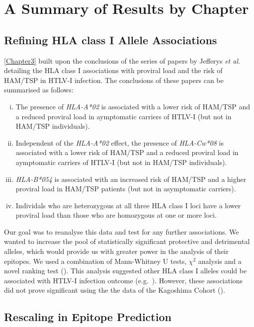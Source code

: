 \section{A Summary of Results by Chapter}

\subsection{Refining HLA class I Allele Associations}

\cref{Chapter3} built upon the conclusions of the series of papers by Jefferys \emph{et al.} \citep{Jeffery1999, Jeffery2000} detailing the HLA class I associations with proviral load and the risk of HAM/TSP in HTLV-I infection. The conclusions of these papers can be summarised as follows:

\begin{enumerate}[(i)]
\item The presence of \emph{HLA-A*02} is associated with a lower risk of HAM/TSP and a reduced proviral load in aymptomatic carriers of HTLV-I (but not in HAM/TSP individuals).
\item Independent of the \emph{HLA-A*02} effect, the presence of \emph{HLA-Cw*08} is associated with a lower risk of HAM/TSP and a reduced proviral load in aymptomatic carriers of HTLV-I (but not in HAM/TSP individuals).
\item \emph{HLA-B*054} is associated with an increased risk of HAM/TSP and a higher proviral load in HAM/TSP patients (but not in asymptomatic carriers).
\item Individals who are heterozygous at all three HLA class I loci have a lower proviral load than those who are homozygous at one or more loci.
\end{enumerate}

Our goal was to reanalyse this data and test for any further associations. We wanted to increase the pool of statistically significant protective and detrimental alleles, which would provide us with greater power in the analysis of their epitopes. We used a combination of Mann-Whitney U tests, $\chi^2$ analysis and a novel ranking test (). This analysis suggested other HLA class I alleles could be associated with HTLV-I infection outcome (e.g.~). However, these associations did not prove significant using the the data of the Kagoshima Cohort ().

\subsection{Rescaling in Epitope Prediction}

